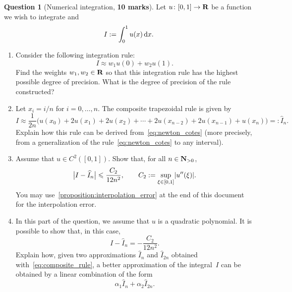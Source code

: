 \documentclass[11pt]{article}
\theoremstyle{definition}
\newtheorem{question}{Question}
\theoremstyle{remark}
\theoremstyle{plain}%
\begin{document}
\newpage
\begin{question}
    [Numerical integration, \textbf{10 marks}]
    Let $u \colon [0, 1] \to \mathbf R$ be a function we wish to integrate and
    \[
        I := \int_{0}^{1} u(x) \, \mathrm d x.
    \]
    \begin{enumerate}
        \item
        Consider the following integration rule:
        \begin{equation}
            \label{eq:newton_cotes}
            I\approx w_1 u(0) + w_2 u(1).
        \end{equation}
        Find the weights $w_1, w_2 \in \mathbf R$ so that this integration rule has the highest possible degree of precision.
        What is the degree of precision of the rule constructed?


        \item
            Let $x_i = i/n$ for $i = 0, \dotsc, n$.
            The composite trapezoidal rule is given by
            \begin{equation}
                \label{eq:composite_rule}
                I
                \approx \frac{1}{2n} \bigl( u(x_0) + 2 u(x_1) + 2 u(x_2) + \dotsb + 2 u(x_{n-2}) + 2 u(x_{n-1}) + u(x_n) \bigr) =: \widehat I_n.
            \end{equation}
            Explain how this rule can be derived from~\eqref{eq:newton_cotes} (more precisely,
            from a generalization of the rule~\eqref{eq:newton_cotes} to any interval).

        \item
            Assume that $u \in C^2([0, 1])$.
            Show that, for all $n \in \mathbf N_{>0}$,
            \begin{equation}
                \label{eq:error_bound_trapezoidal}
                \bigl\lvert I - \widehat I_n \bigr\rvert
                \leq \frac{C_2}{12 n^2},
                \qquad
                C_2 := \sup_{\xi \in [0, 1]} \abs*{u''(\xi)}.
            \end{equation}
            You may use~\cref{proposition:interpolation_error} at the end of this document for the interpolation error.
        \item
        \mymark
        In this part of the question, we assume that $u$ is a quadratic polynomial.
        It is possible to show that, in this case,
        \[
             I - \widehat I_n = - \frac{C_2}{12 n^2}.
        \]
        Explain how, given two approximations $\widehat I_n$ and $\widehat I_{2n}$ obtained with~\eqref{eq:composite_rule},
        a better approximation of the integral~$I$ can be obtained by a linear combination of the form
        \[
            \alpha_1 \widehat I_n + \alpha_2 \widehat I_{2n}.
        \]


\end{enumerate}
\end{question}
\end{document}
